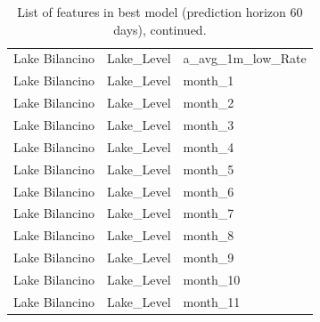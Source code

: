 \documentclass{article}
\begin{document}
\begin{table}
{\begin{tabular}{lll}
     Lake Bilancino &                 Lake\_Level &               a\_avg\_1m\_low\_Rate \\
     Lake Bilancino &                 Lake\_Level &                         month\_1 \\
     Lake Bilancino &                 Lake\_Level &                         month\_2 \\
     Lake Bilancino &                 Lake\_Level &                         month\_3 \\
     Lake Bilancino &                 Lake\_Level &                         month\_4 \\
     Lake Bilancino &                 Lake\_Level &                         month\_5 \\
     Lake Bilancino &                 Lake\_Level &                         month\_6 \\
     Lake Bilancino &                 Lake\_Level &                         month\_7 \\
     Lake Bilancino &                 Lake\_Level &                         month\_8 \\
     Lake Bilancino &                 Lake\_Level &                         month\_9 \\
     Lake Bilancino &                 Lake\_Level &                        month\_10 \\
     Lake Bilancino &                 Lake\_Level &                        month\_11 \\
\bottomrule
\end{tabular}}
\caption{List of features in best model (prediction horizon 60 days), continued.}
\label{tab:feats2}
\end{table}
\end{document}
